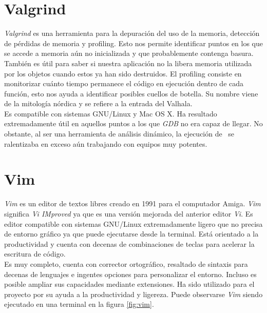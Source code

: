 \section*{Valgrind}

\textit{Valgrind} \cite{website:valgrind} es una herramienta para la
depuración del uso de la memoria, detección de pérdidas de memoria y
profiling. Esto nos permite identificar puntos en los que se accede a memoria
aún no inicializada y que probablemente contenga basura. También es útil
para saber si nuestra aplicación no la libera memoria utilizada por los
objetos cuando estos ya han sido destruidos. El profiling consiste en
monitorizar cuánto tiempo permanece el código en ejecución dentro de cada
función, esto nos ayuda a identificar posibles cuellos de botella. Su nombre
viene de la mitología nórdica y se refiere a la entrada del Valhala.\\

Es compatible con sistemas GNU/Linux y Mac OS X. Ha resultado extremadamente
útil en aquellos puntos a los que \textit{GDB} no era capaz de llegar. No
obstante, al ser una herramienta de análisis dinámico, la ejecución
de \juego\ se ralentizaba en exceso aún trabajando con equipos muy potentes.\\

\section*{Vim}

\textit{Vim} \cite{website:vim} es un editor de textos libres creado en
1991 para el computador Amiga. \textit{Vim} significa \textit{Vi IMproved}
ya que es una versión mejorada del anterior editor \textit{Vi}. Es editor
compatible con sistemas GNU/Linux extremadamente ligero que no precisa
de entorno gráfico ya que puede ejecutarse desde la terminal. Está orientado
a la productividad y cuenta con decenas de combinaciones de teclas para
acelerar la escritura de código.\\

Es muy completo, cuenta con corrector ortográfico, resaltado de sintaxis
para decenas de lenguajes e ingentes opciones para personalizar el entorno.
Incluso es posible ampliar sus capacidades mediante extensiones. Ha sido utilizado
para el proyecto por su ayuda a la productividad y ligereza. Puede observarse
\textit{Vim} siendo ejecutado en una terminal en la figura \ref{fig:vim}.\\ 



